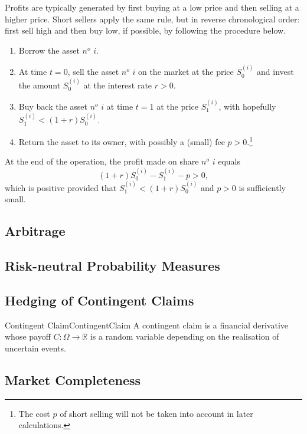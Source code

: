 \noindent Profits are typically generated by first buying at a low price and then selling at a higher price. Short sellers apply the same rule, but in reverse chronological order: first sell high and then buy low, if possible, by following the procedure below.

\begin{enumerate}
    \item Borrow the asset \(n^o\) \(i\).

    \item At time \(t=0\), sell the asset \(n^o\) \(i\) on the market at the price \(S_0^{(i)}\) and invest the amount \(S_0^{(i)}\) at the interest rate \(r > 0\).

    \item Buy back the asset \(n^o\) \(i\) at time \(t=1\) at the price \(S_1^{(i)}\), with hopefully \(S_1^{(i)} < (1+r)S_0^{(i)}\).

    \item Return the asset to its owner, with possibly a (small) fee \(p > 0\).\footnote{The cost \(p\) of short selling will not be taken into account in later calculations.}
\end{enumerate}

\noindent At the end of the operation, the profit made on share \(n^o\) \(i\) equals
\begin{equation} \label{eq:ShortSellingProfit}
    (1+r)S_0^{(i)} - S_1^{(i)} - p > 0,
\end{equation}
which is positive provided that \(S_1^{(i)} < (1+r)S_0^{(i)}\) and \(p > 0\) is sufficiently small.

\subsection{Arbitrage}


\subsection{Risk-neutral Probability Measures}


\subsection{Hedging of Contingent Claims}
\begin{defn}{Contingent Claim}{ContingentClaim}
A contingent claim is a financial derivative whose payoff \(C : \Omega \longrightarrow \mathbb{R}\) is a random variable depending on the realisation of uncertain events.
\end{defn}

\subsection{Market Completeness}
